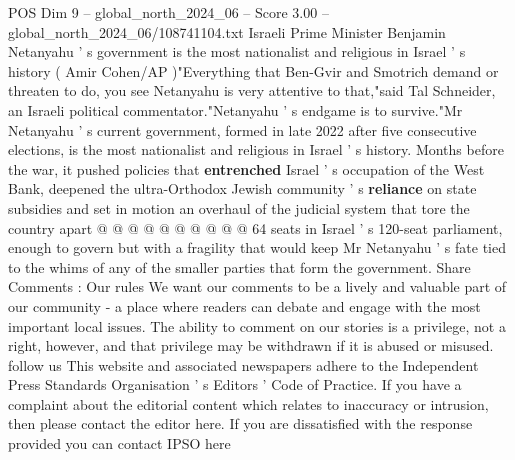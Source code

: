\begin{textsample}{POS Dim 9 – global\_north\_2024\_06 – Score 3.00 – global\_north\_2024\_06/108741104.txt}
Israeli Prime Minister Benjamin Netanyahu ' s government is the most nationalist and religious in Israel ' s history ( Amir Cohen/AP )"Everything that Ben-Gvir and Smotrich demand or threaten to do, you see Netanyahu is very attentive to that,"said Tal Schneider, an Israeli political commentator."Netanyahu ' s endgame is to survive."Mr Netanyahu ' s current government, formed in late 2022 after five consecutive elections, is the most nationalist and religious in Israel ' s history.
Months before the war, it pushed policies that \textbf{entrenched} Israel ' s occupation of the West Bank, deepened the ultra-Orthodox Jewish community ' s \textbf{reliance} on state subsidies and set in motion an overhaul of the judicial system that tore the country apart @ @ @ @ @ @ @ @ @ @ 64 seats in Israel ' s 120-seat parliament, enough to govern but with a fragility that would keep Mr Netanyahu ' s fate tied to the whims of any of the smaller parties that form the government.
Share Comments : Our rules We want our comments to be a lively and valuable part of our community - a place where readers can debate and engage with the most important local issues.
The ability to comment on our stories is a privilege, not a right, however, and that privilege may be withdrawn if it is abused or misused. follow us This website and associated newspapers adhere to the Independent Press Standards Organisation ' s Editors ' Code of Practice.
If you have a complaint about the editorial content which relates to inaccuracy or intrusion, then please contact the editor here.
If you are dissatisfied with the response provided you can contact IPSO here

\end{textsample}
